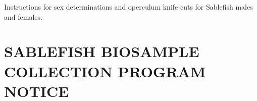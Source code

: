 \documentclass[12pt]{article}\usepackage[]{graphicx}\usepackage[]{color}
\begin{document}
\begin{appendices}
Instructions for sex determinations and operculum knife cuts for Sablefish males and females.
\begin{center} \end{center}

\section{SABLEFISH BIOSAMPLE COLLECTION PROGRAM NOTICE}
\label{app:third-appendix}


\end{appendices}
\end{document}
